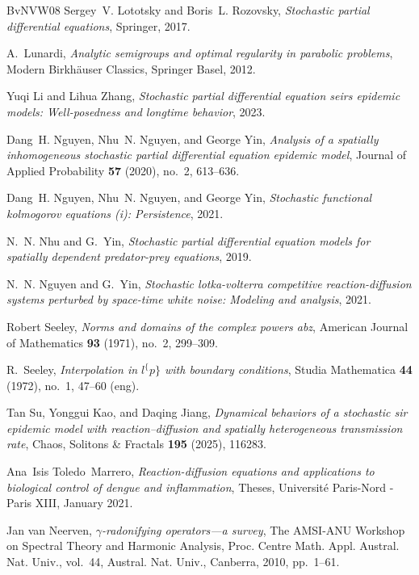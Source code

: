 \documentclass[final]{amsart}
\numberwithin{thm}{section}
\numberwithin{equation}{section}
\begin{document}
\begin{thebibliography}{BvNVW08}
Sergey~V. Lototsky and Boris~L. Rozovsky, \emph{Stochastic partial differential
  equations}, Springer, 2017.

A.~Lunardi, \emph{Analytic semigroups and optimal regularity in parabolic
  problems}, Modern Birkh{\"a}user Classics, Springer Basel, 2012.

Yuqi Li and Lihua Zhang, \emph{Stochastic partial differential equation seirs
  epidemic models: Well-posedness and longtime behavior}, 2023.

Dang~H. Nguyen, Nhu~N. Nguyen, and George Yin, \emph{Analysis of a spatially
  inhomogeneous stochastic partial differential equation epidemic model},
  Journal of Applied Probability \textbf{57} (2020), no.~2, 613–636.

Dang~H. Nguyen, Nhu~N. Nguyen, and George Yin, \emph{Stochastic functional
  kolmogorov equations (i): Persistence}, 2021.

N.~N. Nhu and G.~Yin, \emph{Stochastic partial differential equation models for
  spatially dependent predator-prey equations}, 2019.

N.~N. Nguyen and G.~Yin, \emph{Stochastic lotka-volterra competitive
  reaction-diffusion systems perturbed by space-time white noise: Modeling and
  analysis}, 2021.

Robert Seeley, \emph{Norms and domains of the complex powers abz}, American
  Journal of Mathematics \textbf{93} (1971), no.~2, 299--309.

R.~Seeley, \emph{Interpolation in $l^\{p\}$ with boundary conditions}, Studia
  Mathematica \textbf{44} (1972), no.~1, 47--60 (eng).

Tan Su, Yonggui Kao, and Daqing Jiang, \emph{Dynamical behaviors of a
  stochastic sir epidemic model with reaction–diffusion and spatially
  heterogeneous transmission rate}, Chaos, Solitons \& Fractals \textbf{195}
  (2025), 116283.

Ana~Isis Toledo~Marrero, \emph{{Reaction-diffusion equations and applications
  to biological control of dengue and inflammation}}, Theses, {Universit{\'e}
  Paris-Nord - Paris XIII}, January 2021.

Jan van Neerven, \emph{{$\gamma$}-radonifying operators---a survey}, The
  {AMSI}-{ANU} {W}orkshop on {S}pectral {T}heory and {H}armonic {A}nalysis,
  Proc. Centre Math. Appl. Austral. Nat. Univ., vol.~44, Austral. Nat. Univ.,
  Canberra, 2010, pp.~1--61. 


\end{thebibliography}
\end{document}
